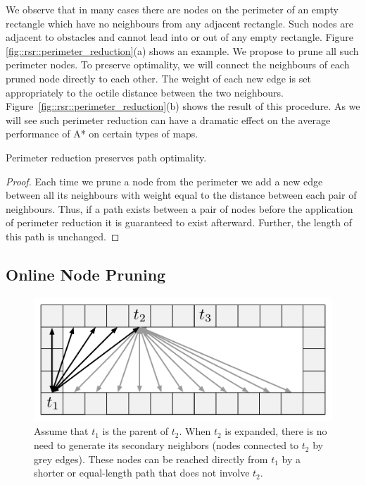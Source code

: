 We observe that in many cases there are nodes on the perimeter of an empty
rectangle which have no neighbours from any adjacent rectangle.  Such nodes
are adjacent to obstacles and cannot lead into or out of any empty rectangle.
Figure \ref{fig::rsr::perimeter_reduction}(a) shows an example.  We propose to prune
all such perimeter nodes. To preserve optimality, we will connect the
neighbours of each pruned node directly to each other.  The weight of each new
edge is set appropriately to the octile distance between the two neighbours.
Figure~\ref{fig::rsr::perimeter_reduction}(b) shows the result of this procedure.
As we will see such perimeter reduction can have a dramatic effect on the
average performance of A* on certain types of maps.
\begin{lemma}
Perimeter reduction preserves path optimality.
\end{lemma}
\begin{proof}
Each time we prune a node from the perimeter we add a new edge between
all its neighbours with weight equal to the distance between each pair
of neighbours.  Thus, if a path exists between a pair of nodes before the
application of perimeter reduction it is guaranteed to exist afterward.
Further, the length of this path is unchanged.
\end{proof}

\subsection{Online Node Pruning}
\label{cha::rsr::online_pruning}

\begin{figure}[bt]
	\begin{center}
	\includegraphics[width=0.5\columnwidth, trim = 10mm 10mm 10mm 0mm]
	{chapter_rsr/diagrams/online_pruning.pdf}
	\end{center}
	\vspace{-3pt}
	\caption[RSR enhancement: online pruning]
    {\small
	Assume that $t_{1}$ is the parent of $t_2$. When $t_2$
	is expanded, there is no need to generate its secondary neighbors
	(nodes connected to $t_2$ by grey edges). These nodes can be reached directly 
	from $t_1$ by a shorter or equal-length path that does not involve $t_2$.
}
\label{fig::rsr::online_pruning}
\end{figure}

